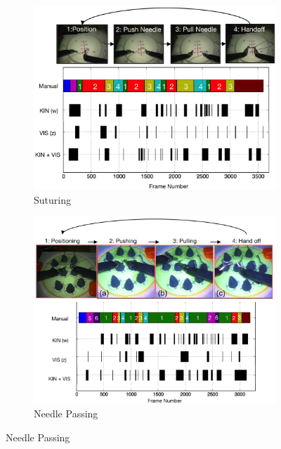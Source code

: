 \begin{figure}[!ht]
	\centering
	\begin{subfigure}[t]{3.4in}
        \includegraphics[width=\linewidth]{figures/suturing}
		\caption{Suturing}
		\label{fig:suturing}
		\vspace{-5pt}
	\end{subfigure}
	 \hspace{0.1in}
	\begin{subfigure}[t]{3.4in}
		\includegraphics[width=\linewidth]{figures/needle_passing}
		\caption{Needle Passing}
		\label{fig:needlePassing}
		\vspace{-5pt}
	\end{subfigure}

\end{figure}
